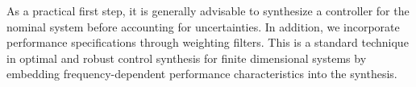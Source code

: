 

As a practical first
step, it is generally advisable to synthesize a controller for the nominal
system before accounting for uncertainties. In addition, we incorporate
performance specifications through weighting filters. This is a standard
technique in optimal and robust control synthesis for finite dimensional
systems by embedding frequency-dependent performance characteristics into the
synthesis.


